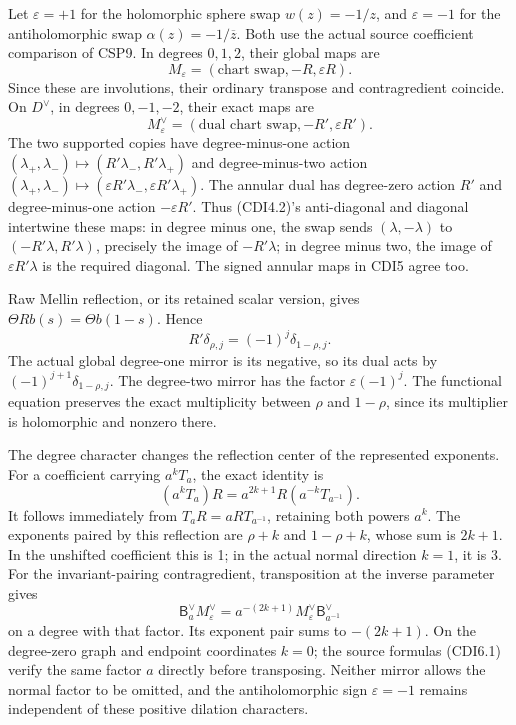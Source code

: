 Let \(\varepsilon=+1\) for the holomorphic sphere swap \(w(z)=-1/z\),
and \(\varepsilon=-1\) for the antiholomorphic swap
\(\alpha(z)=-1/\overline z\). Both use the actual source coefficient
comparison of CSP9. In degrees \(0,1,2\), their global maps are \[
M_\varepsilon=(\text{chart swap},-R,\varepsilon R).
\tag{CDI7.1}
\] Since these are involutions, their ordinary transpose and
contragredient coincide. On \(D^\vee\), in degrees \(0,-1,-2\), their
exact maps are \[
M_\varepsilon^\vee=(\text{dual chart swap},-R',\varepsilon R').
\tag{CDI7.2}
\] The two supported copies have degree-minus-one action
\((\lambda_+,\lambda_-)\mapsto(R'\lambda_-,R'\lambda_+)\) and
degree-minus-two action
\((\lambda_+,\lambda_-)\mapsto(\varepsilon R'\lambda_-,\varepsilon R'\lambda_+)\).
The annular dual has degree-zero action \(R'\) and degree-minus-one
action \(-\varepsilon R'\). Thus (CDI4.2)'s anti-diagonal and diagonal
intertwine these maps: in degree minus one, the swap sends
\((\lambda,-\lambda)\) to \((-R'\lambda,R'\lambda)\), precisely the
image of \(-R'\lambda\); in degree minus two, the image of
\(\varepsilon R'\lambda\) is the required diagonal. The signed annular
maps in CDI5 agree too.

Raw Mellin reflection, or its retained scalar version, gives
\(\Theta Rb(s)=\Theta b(1-s)\). Hence \[
R'\delta_{\rho,j}=(-1)^j\delta_{1-\rho,j}.
\tag{CDI7.3}
\] The actual global degree-one mirror is its negative, so its dual acts
by \((-1)^{j+1}\delta_{1-\rho,j}\). The degree-two mirror has the factor
\(\varepsilon(-1)^j\). The functional equation preserves the exact
multiplicity between \(\rho\) and \(1-\rho\), since its multiplier is
holomorphic and nonzero there.

The degree character changes the reflection center of the represented
exponents. For a coefficient carrying \(a^kT_a\), the exact identity is
\[
(a^kT_a)R=a^{2k+1}R(a^{-k}T_{a^{-1}}).
\tag{CDI7.4}
\] It follows immediately from \(T_aR=aRT_{a^{-1}}\), retaining both
powers \(a^k\). The exponents paired by this reflection are \(\rho+k\)
and \(1-\rho+k\), whose sum is \(2k+1\). In the unshifted coefficient
this is 1; in the actual normal direction \(k=1\), it is 3. For the
invariant-pairing contragredient, transposition at the inverse parameter
gives \[
\mathsf B_a^\vee M_\varepsilon^\vee
=a^{-(2k+1)}M_\varepsilon^\vee\mathsf B_{a^{-1}}^\vee
\tag{CDI7.5}
\] on a degree with that factor. Its exponent pair sums to \(-(2k+1)\).
On the degree-zero graph and endpoint coordinates \(k=0\); the source
formulas (CDI6.1) verify the same factor \(a\) directly before
transposing. Neither mirror allows the normal factor to be omitted, and
the antiholomorphic sign \(\varepsilon=-1\) remains independent of these
positive dilation characters.

